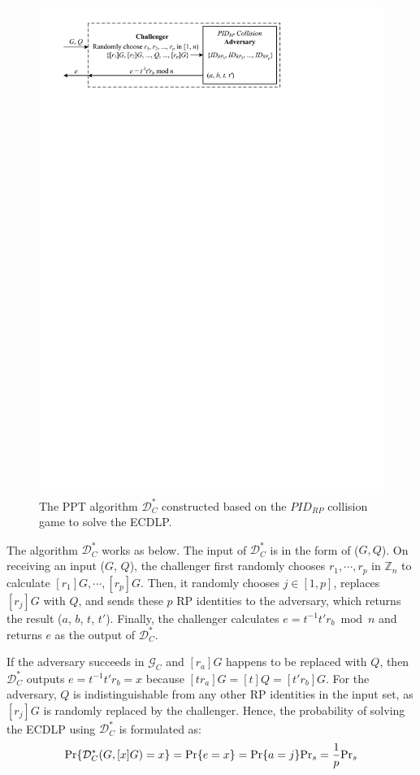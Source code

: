 \begin{figure}[tb]
  \centering
  \includegraphics[width=0.96\linewidth]{fig/ecdlp_algorithm.pdf}
  \caption{The PPT algorithm $\mathcal{D}^*_C$ constructed based on the $PID_{RP}$ collision game to solve the ECDLP.}
  \label{fig:ecdlp_algorithm}
\end{figure}

The algorithm $\mathcal{D}^*_C$ works as below.
The input of $\mathcal{D}^*_C$ is in the form of ($G, Q$). On receiving an input ($G$, $Q$), the challenger first randomly chooses $r_1, \cdots, r_p$ in $\mathbb{Z}_n$ to calculate $[r_1]G, \cdots, [r_p]G$.
Then, it randomly chooses $j \in [1,p]$, replaces $[r_j]G$ with $Q$, and sends these $p$ RP identities to the adversary, which returns the result ($a$, $b$, $t$, $t'$).
Finally, the challenger calculates $e = t^{-1}t'r_b \bmod n$ and returns $e$ as the output of $\mathcal{D}^*_C$.

If the adversary succeeds in $\mathcal{G}_C$ and $[r_a]G$ happens to be replaced with $Q$, then $\mathcal{D}^*_C$ outputs $e=t^{-1}t'r_b =x$ because $[tr_a]G = [t]Q = [t'r_b]G$. For the adversary, $Q$ is indistinguishable from any other RP identities in the input set, as $[r_j]G$ is randomly replaced by the challenger.
Hence, the probability of solving the ECDLP using $\mathcal{D}^*_C$ is formulated as:
\begin{equation*}
{\rm Pr}\{\mathcal{D}^*_C(G, [x]G)=x\} = {\rm Pr}\{e = x\}={\rm Pr}\{a=j\}{\rm Pr}_s=\frac{1}{p}{\rm Pr}_s
\end{equation*}

